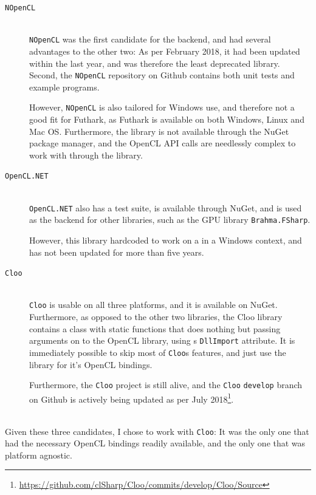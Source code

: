\begin{description}
\item[\texttt{NOpenCL}]\hfill\\
\texttt{NOpenCL} was the first candidate for the \csharp{} backend, and had
several advantages to the other two: As per February 2018, it had been updated
within the last year, and was therefore the least deprecated library. Second,
the \texttt{NOpenCL} repository on Github contains both unit tests and
example programs.

However, \texttt{NOpenCL} is also tailored for Windows use, and therefore not a
good fit for Futhark, as Futhark is available on both Windows, Linux and Mac OS.
Furthermore, the library is not available through the NuGet
package manager, and the OpenCL API calls are needlessly complex to work with
through the library.

\item[\texttt{OpenCL.NET}]\hfill\\
\texttt{OpenCL.NET} also has a test suite, is available through NuGet, and is
used as the backend for other libraries, such as the \fsharp{} GPU library
\texttt{Brahma.FSharp}.

However, this library hardcoded to work on a in a Windows context, and has not been
updated for more than five years.

\item[\texttt{Cloo}]\hfill\\
\texttt{Cloo} is usable on all three
platforms, and it is available on NuGet. Furthermore, as opposed to the other two libraries, the
Cloo library contains a class with static functions that does nothing but
passing arguments on to the OpenCL library, using \csharp{}s \texttt{DllImport}
attribute. It is immediately possible to skip most of \texttt{Cloo}s features,
and just use the library for it's OpenCL bindings.

Furthermore, the \texttt{Cloo} project is still alive, and the \texttt{Cloo}
\texttt{develop} branch on Github is actively being updated as per July 2018\footnote{\url{https://github.com/clSharp/Cloo/commits/develop/Cloo/Source}}.
\\
\\
\end{description}
Given these three candidates, I chose to work with \texttt{Cloo}: It was the
only one that had the necessary OpenCL bindings readily available, and the only
one that was platform agnostic.
